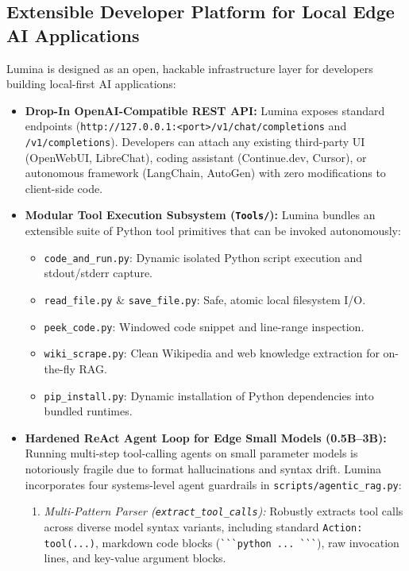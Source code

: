 \documentclass[11pt,a4paper]{article}
\newcommand{\code}[1]{\texttt{#1}}
\begin{document}
\subsection{Extensible Developer Platform for Local Edge AI Applications}\label{sec:dev_platform}
Lumina is designed as an open, hackable infrastructure layer for developers building local-first AI applications:
\begin{itemize}[leftmargin=*]
  \item \textbf{Drop-In OpenAI-Compatible REST API:} Lumina exposes standard endpoints (\verb|http://127.0.0.1:<port>/v1/chat/completions| and \verb|/v1/completions|). Developers can attach any existing third-party UI (OpenWebUI, LibreChat), coding assistant (Continue.dev, Cursor), or autonomous framework (LangChain, AutoGen) with zero modifications to client-side code.
  \item \textbf{Modular Tool Execution Subsystem (\code{Tools/}):} Lumina bundles an extensible suite of Python tool primitives that can be invoked autonomously:
  \begin{itemize}[leftmargin=1.5em]
    \item \code{code\_and\_run.py}: Dynamic isolated Python script execution and stdout/stderr capture.
    \item \code{read\_file.py} \& \code{save\_file.py}: Safe, atomic local filesystem I/O.
    \item \code{peek\_code.py}: Windowed code snippet and line-range inspection.
    \item \code{wiki\_scrape.py}: Clean Wikipedia and web knowledge extraction for on-the-fly RAG.
    \item \code{pip\_install.py}: Dynamic installation of Python dependencies into bundled runtimes.
  \end{itemize}
  \item \textbf{Hardened ReAct Agent Loop for Edge Small Models (0.5B--3B):} Running multi-step tool-calling agents on small parameter models is notoriously fragile due to format hallucinations and syntax drift. Lumina incorporates four systems-level agent guardrails in \code{scripts/agentic\_rag.py}:
  \begin{enumerate}[leftmargin=1.5em]
    \item \emph{Multi-Pattern Parser (\code{extract\_tool\_calls}):} Robustly extracts tool calls across diverse model syntax variants, including standard \code{Action: tool(...)}, markdown code blocks (\verb|```python ... ```|), raw invocation lines, and key-value argument blocks.

\end{enumerate}
\end{itemize}
\end{document}
